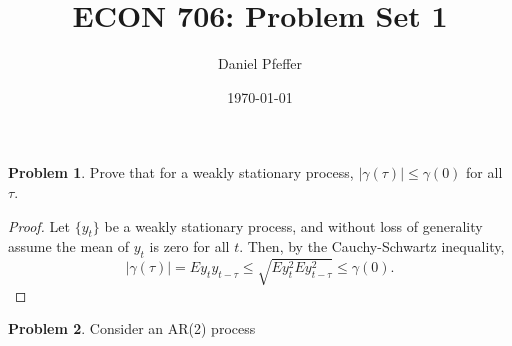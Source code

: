 \documentclass[oneside,reqno]{amsart}
\title{ECON 706: Problem Set 1}
\author{Daniel Pfeffer}
\date{\today}
\theoremstyle{definition}
\newtheorem{prob}{Problem}
\begin{document}
\maketitle

\begin{prob}
Prove that for a weakly stationary process, $|\gamma(\tau)| \leq \gamma(0)$ for all $\tau$.
\end{prob}

\begin{proof}
Let $\{y_t\}$ be a weakly stationary process, and without loss of generality assume the mean of $y_t$ is zero for all $t$. Then, by the Cauchy-Schwartz inequality, 
\[
	| \gamma(\tau) | = E y_t y_{t-\tau} \leq \sqrt{Ey_t^2 Ey_{t-\tau}^2} \leq \gamma(0).
\]
\end{proof}

\begin{prob}
Consider an AR(2) process
\end{prob}
\end{document}
